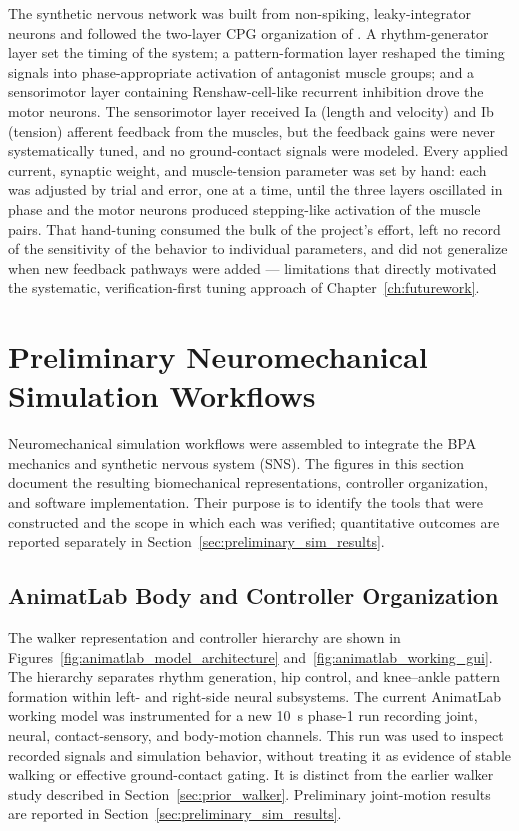 The synthetic nervous network was built from non-spiking, leaky-integrator neurons and followed the two-layer CPG organization of \citet{deng_neuromechanical_2019}. A rhythm-generator layer set the timing of the system; a pattern-formation layer reshaped the timing signals into phase-appropriate activation of antagonist muscle groups; and a sensorimotor layer containing Renshaw-cell-like recurrent inhibition drove the motor neurons. The sensorimotor layer received Ia (length and velocity) and Ib (tension) afferent feedback from the muscles, but the feedback gains were never systematically tuned, and no ground-contact signals were modeled. Every applied current, synaptic weight, and muscle-tension parameter was set by hand: each was adjusted by trial and error, one at a time, until the three layers oscillated in phase and the motor neurons produced stepping-like activation of the muscle pairs. That hand-tuning consumed the bulk of the project's effort, left no record of the sensitivity of the behavior to individual parameters, and did not generalize when new feedback pathways were added --- limitations that directly motivated the systematic, verification-first tuning approach of Chapter~\ref{ch:futurework}.

\section{Preliminary Neuromechanical Simulation Workflows}\label{sec:preliminary_sim_methods}

Neuromechanical simulation workflows were assembled to integrate the BPA mechanics and synthetic nervous system (SNS). The figures in this section document the resulting biomechanical representations, controller organization, and software implementation. Their purpose is to identify the tools that were constructed and the scope in which each was verified; quantitative outcomes are reported separately in Section~\ref{sec:preliminary_sim_results}.

\subsection{AnimatLab Body and Controller Organization}

The walker representation and controller hierarchy are shown in Figures~\ref{fig:animatlab_model_architecture} and~\ref{fig:animatlab_working_gui}. The hierarchy separates rhythm generation, hip control, and knee--ankle pattern formation within left- and right-side neural subsystems. The current AnimatLab working model was instrumented for a new \qty{10}{\second} phase-1 run recording joint, neural, contact-sensory, and body-motion channels. This run was used to inspect recorded signals and simulation behavior, without treating it as evidence of stable walking or effective ground-contact gating. It is distinct from the earlier walker study described in Section~\ref{sec:prior_walker}. Preliminary joint-motion results are reported in Section~\ref{sec:preliminary_sim_results}.

